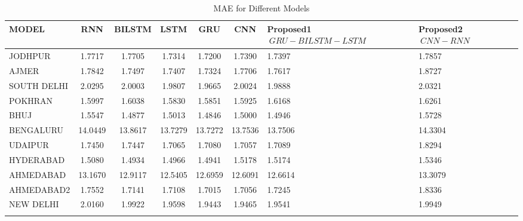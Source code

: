 \documentclass[a4paper,fleqn]{cas-sc}
\begin{document}
  \begin{table}[!ht]
  \centering
  \caption{MAE for Different Models}
  \begin{tabular}{|l|c|c|c|c|c|p{}|p{}|}
  \hline
  \textbf{MODEL} & \textbf{RNN} & \textbf{BILSTM} & \textbf{LSTM} & \textbf{GRU} & \textbf{CNN} &\textbf{Proposed1 \(\ GRU-BILSTM-LSTM \)\ } & \textbf{Proposed2 \(\ CNN-RNN\)\ } \\ \hline
  JODHPUR & 1.7717 & 1.7705 & 1.7314 & 1.7200 & 1.7390 & 1.7397 & 1.7857 \\ \hline
  AJMER & 1.7842 & 1.7497 & 1.7407 & 1.7324 & 1.7706 & 1.7617 & 1.8727 \\ \hline
  SOUTH DELHI & 2.0295 & 2.0003 & 1.9807 & 1.9665 & 2.0024 & 1.9888 & 2.0321 \\ \hline
  POKHRAN & 1.5997 & 1.6038 & 1.5830 & 1.5851 & 1.5925 & 1.6168 & 1.6261 \\ \hline
  BHUJ & 1.5547 & 1.4877 & 1.5013 & 1.4846 & 1.5000 & 1.4946 & 1.5728 \\ \hline
  BENGALURU & 14.0449 & 13.8617 & 13.7279 & 13.7272 & 13.7536 & 13.7506 & 14.3304 \\ \hline
  UDAIPUR & 1.7450 & 1.7447 & 1.7065 & 1.7080 & 1.7057 & 1.7089 & 1.8294 \\ \hline
  HYDERABAD & 1.5080 & 1.4934 & 1.4966 & 1.4941 & 1.5178 & 1.5174 & 1.5346 \\ \hline
  AHMEDABAD & 13.1670 & 12.9117 & 12.5405 & 12.6959 & 12.6091 & 12.6614 & 13.3079 \\ \hline
  AHMEDABAD2 & 1.7552 & 1.7141 & 1.7108 & 1.7015 & 1.7056 & 1.7245 & 1.8336 \\ \hline
  NEW DELHI & 2.0160 & 1.9922 & 1.9598 & 1.9443 & 1.9465 & 1.9541 & 1.9949 \\ \hline
  \label{}
  \end{tabular}
  \end{table}
\end{document}
